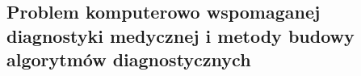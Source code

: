 \subsection{Problem komputerowo wspomaganej diagnostyki medycznej i metody budowy algorytmów diagnostycznych}